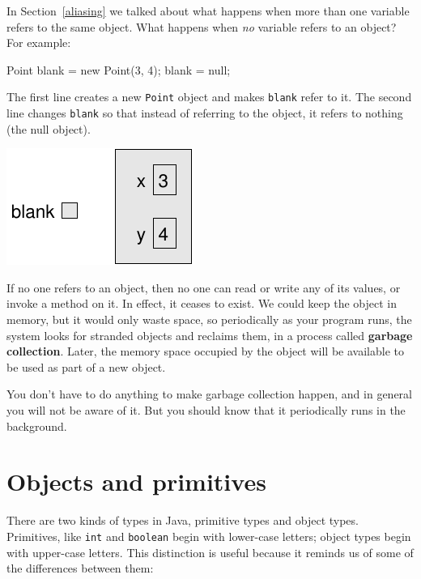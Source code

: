 In Section~\ref{aliasing} we talked about what happens when
more than one variable refers to the same object.  What happens
when {\em no} variable refers to an object?  For example:

\begin{code}
    Point blank = new Point(3, 4);
    blank = null;
\end{code}
%
The first line creates a new {\tt Point} object and makes
{\tt blank} refer to it.  The second line changes {\tt blank}
so that instead of referring to the object, it refers to
nothing (the null object).


\includegraphics{figs/reference3.pdf}


If no one refers to an object, then no one can read or write any of
its values, or invoke a method on it.  In effect, it ceases to exist.
We could keep the object in memory, but it would only waste space, so
periodically as your program runs, the system looks for stranded
objects and reclaims them, in a process called {\bf garbage
collection}.  Later, the memory space occupied by the object will
be available to be used as part of a new object.

You don't have to do anything to make garbage collection happen,
and in general you will not be aware of it.  But you
should know that it periodically runs in the background.


\section{Objects and primitives}

There are two kinds of types in Java, primitive types and
object types.  Primitives, like {\tt int} and {\tt boolean}
begin with lower-case letters; object types begin with
upper-case letters.  This distinction is useful because it
reminds us of some of the differences between them:

